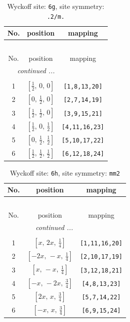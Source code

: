 \documentclass[fleqn,8pt]{jsarticle}
\begin{document}
\renewcommand{\arraystretch}{1.2}
\begin{longtable}{ccc}
\caption{Wyckoff site: {\tt 6g}, site symmetry: {\tt .2/m.}}
 \\
 \hline \hline
No. & position & mapping \\ \hline \endfirsthead

\multicolumn{2}{l}{\tablename\ \thetable{}} \\
 \hline \hline
No. & position & mapping \\ \hline \endhead

 \hline \hline
\multicolumn{2}{r}{\footnotesize\it continued ...} \\ \endfoot

 \hline \hline
\multicolumn{2}{r}{} \\ \endlastfoot

1 & $\left[ \frac{1}{2},\, 0,\, 0 \right]$ & {\tt [1,8,13,20]} \\ \hline
2 & $\left[ 0,\, \frac{1}{2},\, 0 \right]$ & {\tt [2,7,14,19]} \\ \hline
3 & $\left[ \frac{1}{2},\, \frac{1}{2},\, 0 \right]$ & {\tt [3,9,15,21]} \\ \hline
4 & $\left[ \frac{1}{2},\, 0,\, \frac{1}{2} \right]$ & {\tt [4,11,16,23]} \\ \hline
5 & $\left[ 0,\, \frac{1}{2},\, \frac{1}{2} \right]$ & {\tt [5,10,17,22]} \\ \hline
6 & $\left[ \frac{1}{2},\, \frac{1}{2},\, \frac{1}{2} \right]$ & {\tt [6,12,18,24]} \\
\end{longtable}
\renewcommand{\arraystretch}{1.2}
\begin{longtable}{ccc}
\caption{Wyckoff site: {\tt 6h}, site symmetry: {\tt mm2}}
 \\
 \hline \hline
No. & position & mapping \\ \hline \endfirsthead

\multicolumn{2}{l}{\tablename\ \thetable{}} \\
 \hline \hline
No. & position & mapping \\ \hline \endhead

 \hline \hline
\multicolumn{2}{r}{\footnotesize\it continued ...} \\ \endfoot

 \hline \hline
\multicolumn{2}{r}{} \\ \endlastfoot

1 & $\left[ x,\, 2 x,\, \frac{1}{4} \right]$ & {\tt [1,11,16,20]} \\ \hline
2 & $\left[ - 2 x,\, - x,\, \frac{1}{4} \right]$ & {\tt [2,10,17,19]} \\ \hline
3 & $\left[ x,\, - x,\, \frac{1}{4} \right]$ & {\tt [3,12,18,21]} \\ \hline
4 & $\left[ - x,\, - 2 x,\, \frac{3}{4} \right]$ & {\tt [4,8,13,23]} \\ \hline
5 & $\left[ 2 x,\, x,\, \frac{3}{4} \right]$ & {\tt [5,7,14,22]} \\ \hline
6 & $\left[ - x,\, x,\, \frac{3}{4} \right]$ & {\tt [6,9,15,24]} \\
\end{longtable}
\end{document}

